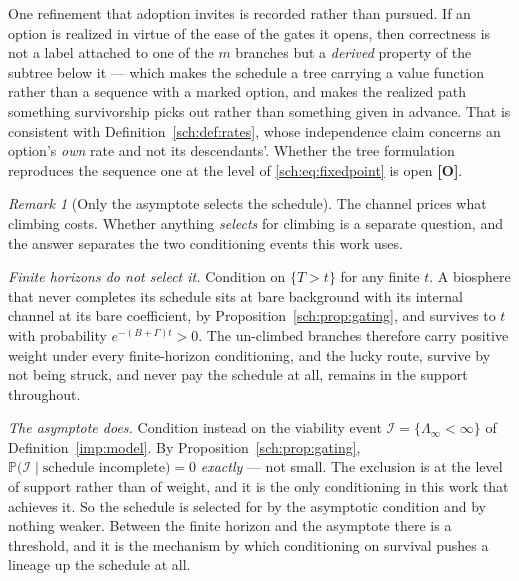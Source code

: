 \documentclass[11pt]{article}
\newcommand{\PP}{\mathbb{P}}
\newcommand{\Imm}{\mathcal{I}}
\theoremstyle{plain}
\theoremstyle{definition}
\theoremstyle{remark}
\newtheorem{remark}[theorem]{Remark}
\begin{document}
One refinement that adoption invites is recorded rather than pursued. If
an option is realized in virtue of the ease of the gates it opens, then
correctness is not a label attached to one of the $m$ branches but a
\emph{derived} property of the subtree below it --- which makes the
schedule a tree carrying a value function rather than a sequence with a
marked option, and makes the realized path something survivorship picks
out rather than something given in advance. That is consistent with
Definition~\ref{sch:def:rates}, whose independence claim concerns an
option's \emph{own} rate and not its descendants'. Whether the tree
formulation reproduces the sequence one at the level of
\eqref{sch:eq:fixedpoint} is open \textbf{[O]}.

\begin{remark}[Only the asymptote selects the schedule]
\label{sch:rem:asymptote}
The channel prices what climbing costs. Whether anything \emph{selects}
for climbing is a separate question, and the answer separates the two
conditioning events this work uses.

\emph{Finite horizons do not select it.} Condition on $\{T>t\}$ for any
finite $t$. A biosphere that never completes its schedule sits at bare
background with its internal channel at its bare coefficient, by
Proposition~\ref{sch:prop:gating}, and survives to $t$ with probability
$e^{-(B+\Gamma)t}>0$. The un-climbed branches therefore carry
positive weight under every finite-horizon conditioning, and the lucky
route, survive by not being struck, and never pay the schedule at all, remains in the support throughout.

\emph{The asymptote does.} Condition instead on the viability event
$\Imm=\{\Lambda_\infty<\infty\}$ of Definition~\ref{imp:model}. By
Proposition~\ref{sch:prop:gating},
$\PP\bigl(\Imm\mid\text{schedule incomplete}\bigr)=0$ \emph{exactly} ---
not small. The exclusion is at the level of support rather than of
weight, and it is the only conditioning in this work that achieves it. So the schedule is selected for by the asymptotic condition and by
nothing weaker. Between the finite horizon and the asymptote there is a
threshold, and it is the mechanism by which conditioning on survival
pushes a lineage up the schedule at all.


\end{remark}
\end{document}

